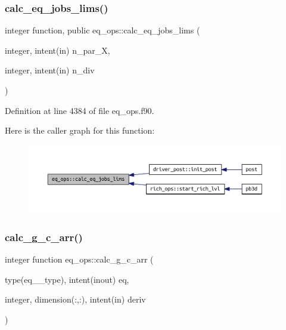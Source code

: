 \subsubsection{\texorpdfstring{calc\+\_\+eq\+\_\+jobs\+\_\+lims()}{calc\_eq\_jobs\_lims()}}
{\footnotesize\ttfamily integer function, public eq\+\_\+ops\+::calc\+\_\+eq\+\_\+jobs\+\_\+lims (\begin{DoxyParamCaption}\item[{integer, intent(in)}]{n\+\_\+par\+\_\+X,  }\item[{integer, intent(in)}]{n\+\_\+div }\end{DoxyParamCaption})}



Definition at line 4384 of file eq\+\_\+ops.\+f90.

Here is the caller graph for this function\+:
\nopagebreak
\begin{figure}[H]
\begin{center}
\leavevmode
\includegraphics[width=350pt]{namespaceeq__ops_a4e20b8725fce149449f83754244dc84e_icgraph}
\end{center}
\end{figure}
\mbox{\label{namespaceeq__ops_a7f4a16387d43c37a1dfa78eb4f91d4e4}} 
\subsubsection{\texorpdfstring{calc\+\_\+g\+\_\+c\+\_\+arr()}{calc\_g\_c\_arr()}}
{\footnotesize\ttfamily integer function eq\+\_\+ops\+::calc\+\_\+g\+\_\+c\+\_\+arr (\begin{DoxyParamCaption}\item[{type(eq\+\_\+2\+\_\+type), intent(inout)}]{eq,  }\item[{integer, dimension(\+:,\+:), intent(in)}]{deriv }\end{DoxyParamCaption})}



